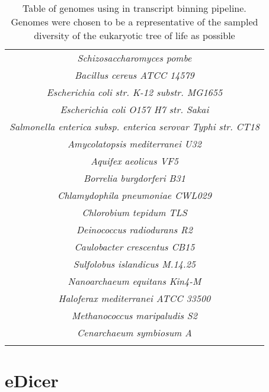 \begin{center}
\begin{longtable}{|c|}
		\textit{Schizosaccharomyces pombe}\\
		\textit{Bacillus cereus ATCC 14579}\\
		\textit{Escherichia coli str. K-12 substr. MG1655}\\
		\textit{Escherichia coli O157 H7 str. Sakai}\\
		\textit{Salmonella enterica subsp. enterica serovar Typhi str. CT18}\\
		\textit{Amycolatopsis mediterranei U32}\\
		\textit{Aquifex aeolicus VF5}\\
		\textit{Borrelia burgdorferi B31}\\
		\textit{Chlamydophila pneumoniae CWL029}\\
		\textit{Chlorobium tepidum TLS}\\
		\textit{Deinococcus radiodurans R2}\\
		\textit{Caulobacter crescentus CB15}\\
		\textit{Sulfolobus islandicus M.14.25}\\
		\textit{Nanoarchaeum equitans Kin4-M}\\
		\textit{Haloferax mediterranei ATCC 33500}\\
		\textit{Methanococcus maripaludis S2}\\
		\textit{Cenarchaeum symbiosum A}\\
	\hline
	\caption{Table of genomes using in transcript binning pipeline.
		Genomes were chosen to be a representative of the sampled diversity of the 
		eukaryotic tree of life as possible}
	\label{tab:appen_genomes}

	\end{longtable}
\end{center}

\section{eDicer}

